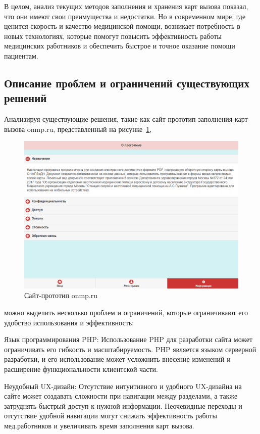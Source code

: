 В целом, анализ текущих методов заполнения и хранения карт вызова показал, что они имеют свои преимущества и недостатки. Но в современном мире, где ценится скорость и качество медицинской помощи, возникает потребность в новых технологиях, которые помогут повысить эффективность работы медицинских работников и обеспечить быстрое и точное оказание помощи пациентам.

\subsection{Описание проблем и ограничений существующих решений}

Анализируя существующие решения, такие как сайт-прототип заполнения карт вызова onmp.ru, представленный на рисунке~\ref{fig:onmp-prototype},

\begin{figure}
  \includegraphics[scale=0.5]{styles/diploma/inc/onmp-prototype.png}
  \caption{Сайт-прототип onmp.ru}
  \label{fig:onmp-prototype}
\end{figure}
можно выделить несколько проблем и ограничений, которые ограничивают его удобство использования и эффективность:

Язык программирования PHP: Использование PHP для разработки сайта может ограничивать его гибкость и масштабируемость. PHP является языком серверной разработки, и его использование может усложнить внесение изменений и расширение функциональности клиентской части.

Неудобный UX-дизайн: Отсутствие интуитивного и удобного UX-дизайна на сайте может создавать сложности при навигации между разделами, а также затруднять быстрый доступ к нужной информации. Неочевидные переходы и отсутствие удобной навигации могут снижать эффективность работы мед.работников и увеличивать время заполнения карт вызова.


